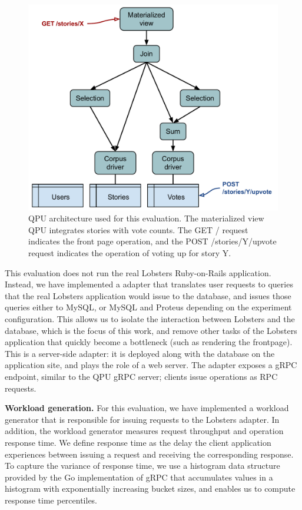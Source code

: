 \begin{figure}[t]
  \centering
    \includegraphics[scale=0.5]{./figures/case_studies/lobsters_architecture_basic.pdf}
  \caption{QPU architecture used for this evaluation. The materialized view QPU integrates stories with vote counts.
  The GET / request indicates the front page operation, and the POST /stories/Y/upvote request indicates the operation of voting up for story Y.}
  \label{fig:eval_lobsters_qpu_arch}
\end{figure}

This evaluation does not run the real Lobsters Ruby-on-Rails application.
Instead, we have implemented a adapter that translates user requests to queries that the real
Lobsters application would issue to the database,
and issues those queries either to MySQL, or MySQL and Proteus depending on the experiment configuration.
This allows us to isolate the interaction between Lobsters and the database, which is the focus of this work,
and remove other tasks of the Lobsters application that quickly become a bottleneck (such as rendering the frontpage).
This is a server-side adapter: it is deployed along with the database on the application site,
and plays the role of a web server.
The adapter exposes a gRPC endpoint, similar to the QPU gRPC server; clients issue operations as RPC requests.

\bigskip
\noindent
\textbf{Workload generation.}
For this evaluation, we have implemented a workload generator \cite{lobsters:bench} that is responsible for issuing
requests to the Lobsters adapter.
In addition, the workload generator measures request throughput and operation response time.
We define response time as the delay the client application experiences between issuing a request and receiving the
corresponding response.
To capture the variance of response time, we use a histogram data structure provided by the Go implementation of gRPC \cite{grpcgo:histogram}
that accumulates values in a histogram with exponentially increasing bucket sizes, and enables us to compute response time percentiles.

